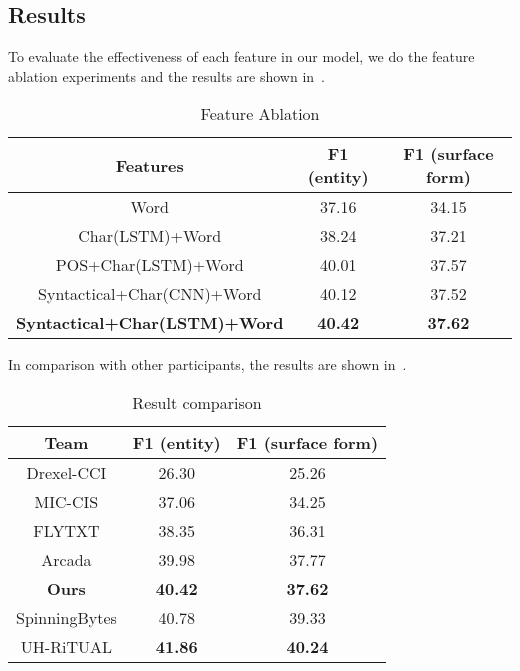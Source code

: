 \subsection{Results} 
To evaluate the effectiveness of each feature in our model, we do the feature ablation experiments and the results are shown in~.

\begin{table}[th]
	\scriptsize
	\centering
	\caption{Feature Ablation}
	\label{tbl:feature}
	\begin{tabular}{|c|c|c|}
		\hline
		\textbf{Features}                & \textbf{F1 (entity) }   & \textbf{F1 (surface form)} \\ \hline
		Word            & 37.16         & 34.15            \\ \hline
		Char(LSTM)+Word              &38.24         & 37.21             \\ \hline
		POS+Char(LSTM)+Word              & 40.01          & 37.57             \\ \hline
		{Syntactical+Char(CNN)+Word} & { 40.12} & { 37.52   }    \\ \hline 
		\textbf{Syntactical+Char(LSTM)+Word} & \textbf{ 40.42} & \textbf{ 37.62   }    \\ \hline 
		
	\end{tabular}
\end{table}

In comparison with other participants, the results are shown in~.

\begin{table}[th]
	\scriptsize
	\centering
	\caption{Result comparison}
	\label{tbl:compare}
	\begin{tabular}{|c|c|c|}
		\hline
		\textbf{Team}                & \textbf{F1 (entity) }   & \textbf{F1 (surface form)} \\ \hline
		Drexel-CCI          &  26.30         & 25.26            \\ \hline
		MIC-CIS             & 37.06         & 34.25            \\ \hline
		FLYTXT              &38.35         & 36.31             \\ \hline
		Arcada              & 39.98          & 37.77             \\ \hline
		\textbf{Ours} & \textbf{ 40.42} & \textbf{ 37.62   }    \\ \hline
		SpinningBytes       & 40.78       &  39.33          \\ \hline
		UH-RiTUAL           & \textbf{  41.86   }       & \textbf{ 40.24 }            \\ \hline
	\end{tabular}
\end{table}

